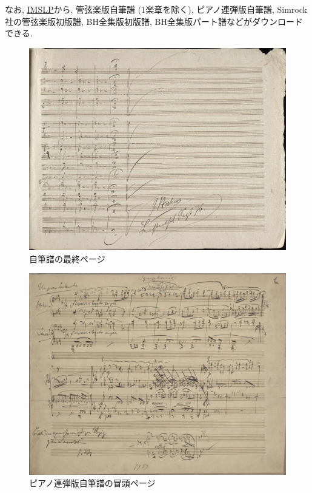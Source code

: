 なお, \href{http://imslp.org/wiki/Symphony_No.1,_Op.68_(Brahms,_Johannes)}{IMSLP}から,
管弦楽版自筆譜 (1楽章を除く), ピアノ連弾版自筆譜, Simrock社の管弦楽版初版譜, BH全集版初版譜, BH全集版パート譜などがダウンロードできる.

\begin{figure}[htbp]
	\centering
    \includegraphics[clip,width=12.0cm]{./figure/mov4-59.jpg}
	\caption{自筆譜の最終ページ}
    \label{fig: mov4-59}
\end{figure}

\begin{figure}[htbp]
	\centering
    \includegraphics[clip,width=12.0cm]{./figure/mov1(4H)-01.jpg}
	\caption{ピアノ連弾版自筆譜の冒頭ページ}
    \label{fig: mov1(4H)-01}
\end{figure}
